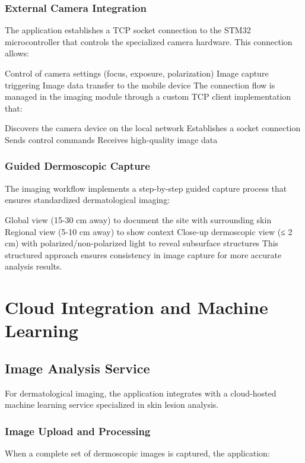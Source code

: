 \subsubsection{External Camera Integration}

The application establishes a TCP socket connection to the STM32 microcontroller that controls the specialized camera hardware. This connection allows:

Control of camera settings (focus, exposure, polarization)
Image capture triggering
Image data transfer to the mobile device
The connection flow is managed in the imaging module through a custom TCP client implementation that:

Discovers the camera device on the local network
Establishes a socket connection
Sends control commands
Receives high-quality image data
\subsubsection{Guided Dermoscopic Capture}

The imaging workflow implements a step-by-step guided capture process that ensures standardized dermatological imaging:

Global view (15-30 cm away) to document the site with surrounding skin
Regional view (5-10 cm away) to show context
Close-up dermoscopic view (≤ 2 cm) with polarized/non-polarized light to reveal subsurface structures
This structured approach ensures consistency in image capture for more accurate analysis results.

\section{Cloud Integration and Machine Learning}

\subsection{Image Analysis Service}

For dermatological imaging, the application integrates with a cloud-hosted machine learning service specialized in skin lesion analysis.

\subsubsection{Image Upload and Processing}

When a complete set of dermoscopic images is captured, the application:

